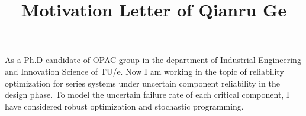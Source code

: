 \documentclass[10pt,a4paper]{article}
\begin{document}
\title{Motivation Letter of Qianru Ge}

As a Ph.D candidate of OPAC group in the department of Industrial Engineering and Innovation Science of TU/e. Now I am working in the topic of reliability optimization for series systems under uncertain component reliability in the design phase. To model the uncertain failure rate of each critical component, I have considered robust optimization and stochastic programming. 
\end{document}
